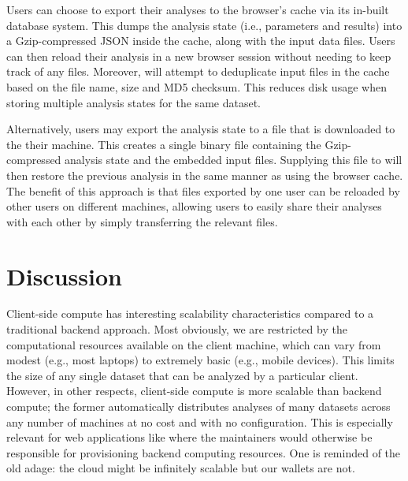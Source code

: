 \documentclass{article}
\begin{document}
Users can choose to export their analyses to the browser's cache via its in-built  database system.
This dumps the analysis state (i.e., parameters and results) into a Gzip-compressed JSON inside the cache, along with the input data files.
Users can then reload their analysis in a new browser session without needing to keep track of any files.
Moreover,  will attempt to deduplicate input files in the cache based on the file name, size and MD5 checksum.
This reduces disk usage when storing multiple analysis states for the same dataset. 

Alternatively, users may export the analysis state to a file that is downloaded to the their machine.
This creates a single binary file containing the Gzip-compressed analysis state and the embedded input files.
Supplying this file to  will then restore the previous analysis in the same manner as using the browser cache.
The benefit of this approach is that files exported by one user can be reloaded by other users on different machines,
allowing users to easily share their analyses with each other by simply transferring the relevant files.

\section{Discussion}

Client-side compute has interesting scalability characteristics compared to a traditional backend approach.
Most obviously, we are restricted by the computational resources available on the client machine,
which can vary from modest (e.g., most laptops) to extremely basic (e.g., mobile devices).
This limits the size of any single dataset that can be analyzed by a particular client.
However, in other respects, client-side compute is more scalable than backend compute;
the former automatically distributes analyses of many datasets across any number of machines at no cost and with no configuration.
This is especially relevant for web applications like  where the maintainers would otherwise be responsible for provisioning backend computing resources.
One is reminded of the old adage: the cloud might be infinitely scalable but our wallets are not.
\end{document}
